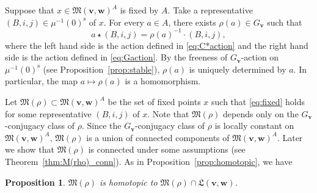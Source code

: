 \documentclass[12pt]{amsart}
\def\frak{\mathfrak}
\newtheorem{Proposition}[equation]{Proposition}
\theoremstyle{definition}
\theoremstyle{remark}
\numberwithin{equation}{subsection}
\newcommand{\thmref}[1]{Theorem~\ref{#1}}
\newcommand{\propref}[1]{Proposition~\ref{#1}}
\newcommand{\M}{{\frak M}} %
\newcommand{\La}{{\frak L}} %
\newcommand{\bv}{{\mathbf v}} %
\newcommand{\bw}{{\mathbf w}} %
\begin{document}
Suppose that $x\in \M(\bv,\bw)^A$ is fixed by $A$. Take a
representative $(B,i,j)\in\mu^{-1}(0)^{\operatorname{s}}$ of $x$.
For every $a\in A$, there exists $\rho(a)\in G_\bv$ such that
\begin{equation}\label{eq:fixed}
   a \star (B,i,j) = \rho(a)^{-1} \cdot (B,i,j),
\end{equation}
where the left hand side is the action defined in \eqref{eq:C*action}
and the right hand side is the action defined in
\eqref{eq:Gaction}. By the freeness of $G_\bv$-action on
$\mu^{-1}(0)^{\operatorname{s}}$ (see \propref{prop:stable}), $\rho(a)$
is uniquely determined by $a$. In particular, the map $a\mapsto
\rho(a)$ is a homomorphism. 

Let $\M(\rho) \subset \M(\bv,\bw)^A$ be the set of fixed points
$x$ such that \eqref{eq:fixed} holds for some representative
$(B,i,j)$ of $x$. Note that $\M(\rho)$ depends only on the
$G_\bv$-conjugacy class of $\rho$.
Since the $G_\bv$-conjugacy class of $\rho$ is locally constant on
$\M(\bv,\bw)^A$, $\M(\rho)$ is a union of connected components of
$\M(\bv,\bw)^A$. Later we show that $\M(\rho)$ is connected under some 
assumptions (see \thmref{thm:M(rho)_conn}).
%
As in \propref{prop:homotopic}, we have
\begin{Proposition}\label{prop:homotopic'}
$\M(\rho)$ is homotopic to $\M(\rho)\cap\La(\bv,\bw)$.
\end{Proposition}
\end{document}
